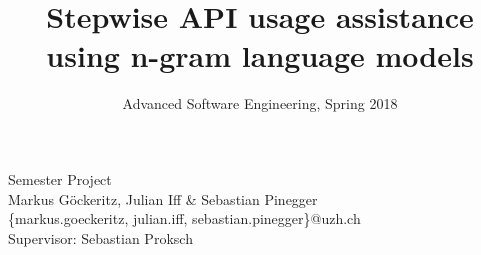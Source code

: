 \documentclass{seal_article}
\title{Stepwise API usage assistance using n-gram language models}
\subtitle{Advanced Software Engineering, Spring 2018}
\begin{document}
\maketitle

\iftexshop
\setprotcode\font
{\it \setprotcode \font}
{\bf \setprotcode \font}
{\bf \it \setprotcode \font}
\fi

\noindent Semester Project\\
\noindent Markus G\"ockeritz, Julian Iff \& Sebastian Pinegger\\
\noindent \{markus.goeckeritz, julian.iff, sebastian.pinegger\}@uzh.ch\\
\noindent Supervisor: Sebastian Proksch









\end{document}
